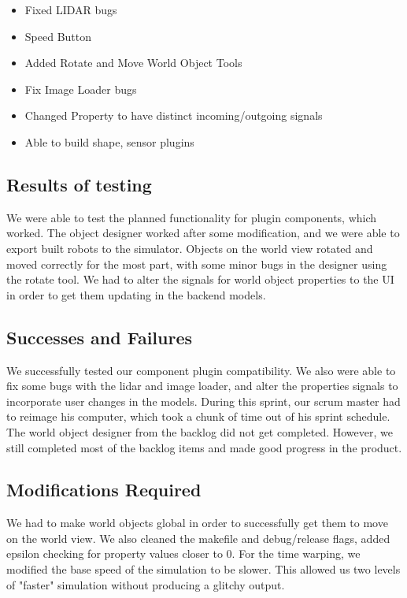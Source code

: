 \begin{itemize}
	\item Fixed LIDAR bugs	
	\item Speed Button
	\item Added Rotate and Move World Object Tools
	\item Fix Image Loader bugs
	\item Changed Property to have distinct incoming/outgoing signals
	\item Able to build shape, sensor plugins
\end{itemize}

\subsection{Results of testing}

We were able to test the planned functionality for plugin components, which worked. The object designer worked after some modification, and we were able to export built robots to the simulator. Objects on the world view rotated and moved correctly for the most part, with some minor bugs in the designer using the rotate tool. We had to alter the signals for world object properties to the UI in order to get them updating in the backend models.

\subsection{Successes and Failures}
We successfully tested our component plugin compatibility. We also were able to fix some bugs with the lidar and image loader, and alter the properties signals to incorporate user changes in the models. During this sprint, our scrum master had to reimage his computer, which took a chunk of time out of his sprint schedule. The world object designer from the backlog did not get completed. However, we still completed most of the backlog items and made good progress in the product.

\subsection{Modifications Required}
We had to make world objects global in order to successfully get them to move on the world view. We also cleaned the makefile and debug/release flags, added epsilon checking for property values closer to 0. For the time warping, we modified the base speed of the simulation to be slower. This allowed us two levels of "faster" simulation without producing a glitchy output.

